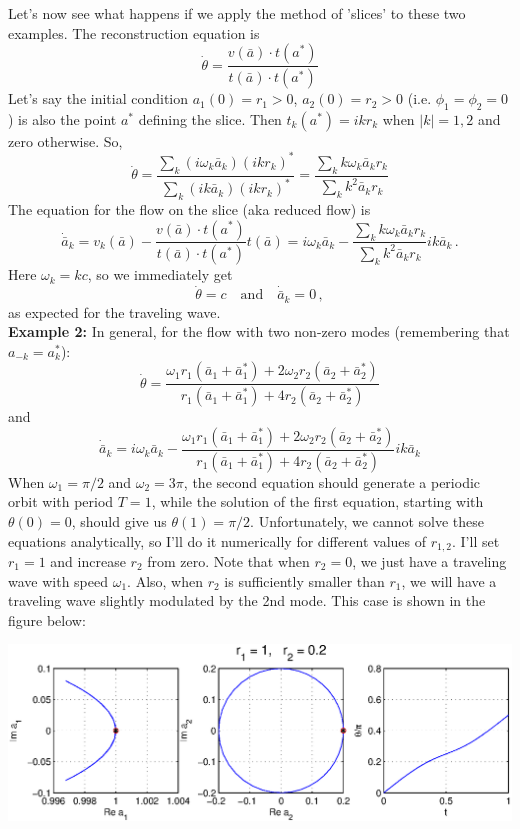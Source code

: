 \documentclass[letter,10pt]{article}
\begin{document}
Let's now see what happens if we apply the method of 'slices' to these two examples.  The reconstruction equation is
\[ \dot{\theta} = \frac{v(\bar{a}) \cdot t(a^*)}{t(\bar{a}) \cdot t(a^*)} \]
Let's say the initial condition $a_1(0) = r_1 > 0$, $a_2(0) = r_2 > 0$ (i.e. $\phi_1 = \phi_2 = 0$) is also the point $a^*$ defining the slice.  Then
$t_k(a^*) = ikr_k$ when $|k| = 1,2$ and zero otherwise.  So,
\[ \dot{\theta} = \frac{\sum_k (i\omega_k \bar{a}_k) (ikr_k)^*}{\sum_k (i k \bar{a}_k)(ikr_k)^*}
                = \frac{\sum_k k \omega_k \bar{a}_k r_k}{\sum_k k^2 \bar{a}_k r_k}\]
The equation for the flow on the slice (aka reduced flow) is
\[ \dot{\bar{a}}_k = v_k(\bar{a}) - \frac{v(\bar{a}) \cdot t(a^*)}{t(\bar{a}) \cdot t(a^*)} t(\bar{a})
                   = i\omega_k \bar{a}_k - \frac{\sum_k k \omega_k \bar{a}_k r_k}{\sum_k k^2 \bar{a}_k r_k} ik\bar{a}_k\,. \]
 Here $\omega_k = kc$, so we immediately get
\[ \dot{\theta} = c \quad \mathrm{and} \quad \dot{\bar{a}}_k = 0\,, \]
as expected for the traveling wave.\\
{\bf Example 2:} In general, for the flow with two non-zero modes (remembering that $a_{-k} = a_k^*$):
\[ \dot{\theta} = \frac{\omega_1 r_1 (\bar{a}_1 + \bar{a}_1^*) + 2\omega_2 r_2 (\bar{a}_2 + \bar{a}_2^*)}{r_1(\bar{a}_1 + \bar{a}_1^*) + 4r_2 (\bar{a}_2 + \bar{a}_2^*)} \]
and
\[ \dot{\bar{a}}_k = i\omega_k \bar{a}_k - \frac{\omega_1 r_1 (\bar{a}_1 + \bar{a}_1^*) + 2\omega_2 r_2 (\bar{a}_2 + \bar{a}_2^*)}{r_1(\bar{a}_1 + \bar{a}_1^*) + 4r_2 (\bar{a}_2 + \bar{a}_2^*)}ik\bar{a}_k \]
When $\omega_1 = \pi/2$ and $\omega_2 = 3\pi$, the second equation should generate a periodic orbit with period $T = 1$, while the solution of the first equation, starting with $\theta(0) = 0$, should give us $\theta(1) = \pi/2$.  Unfortunately, we cannot solve these equations analytically, so I'll do it numerically for different values of $r_{1,2}$.  I'll set $r_1 = 1$ and increase $r_2$ from zero.  Note that when $r_2 = 0$, we just have a traveling wave with speed $\omega_1$.  Also, when $r_2$ is sufficiently smaller than $r_1$, we will have a traveling wave slightly modulated by the 2nd mode.  This case is shown in the figure below:

\vspace{2ex}\noindent\includegraphics[width=\textwidth]{sliceflow1.eps}
\end{document}
